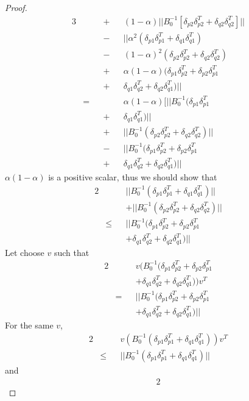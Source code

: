 \documentclass[11pt,twocolumn,varwidth=true,a4paper,fleqn]{article}
\begin{document}
\begin{proof}
\begin{alignat*}{3}
& && + && (1-\alpha)||B_0^{-1}[\delta_{p2}\delta_{p2}^T +
\delta_{q2}\delta_{q2}^T]|| \\
& && - && || \alpha^2(\delta_{p1}\delta_{p1}^T + \delta_{q1}\delta_{q1}^T) \\
& && - && (1-\alpha)^2(\delta_{p2}\delta_{p2}^T + \delta_{q2}\delta_{q2}^T) \\
& && + && \alpha(1-\alpha)(\delta_{p1}\delta_{p2}^T+\delta_{p2}\delta_{p1}^T \\
& && + && \delta_{q1}\delta_{q2}^T+\delta_{q2}\delta_{q1}^T) || \\
& = && && \alpha(1-\alpha)[||B_0^{-1}(\delta_{p1}\delta_{p1}^T \\
& && + && \delta_{q1}\delta_{q1}^T)||\\
& && + && ||B_0^{-1}(\delta_{p2}\delta_{p2}^T + \delta_{q2}\delta_{q2}^T)|| \\
& && - && ||B_0^{-1}(\delta_{p1}\delta_{p2}^T+\delta_{p2}\delta_{p1}^T \\
& && + && \delta_{q1}\delta_{q2}^T+\delta_{q2}\delta_{q1}^T)||
\end{alignat*}
$\alpha(1-\alpha)$ is a positive scalar, thus we should show that
\begin{alignat*}{2}
& && ||B_0^{-1}(\delta_{p1}\delta_{p1}^T + \delta_{q1}\delta_{q1}^T)|| \\
& && + ||B_0^{-1}(\delta_{p2}\delta_{p2}^T + \delta_{q2}\delta_{q2}^T)|| \\
& \leq &&  ||B_0^{-1}(\delta_{p1}\delta_{p2}^T+\delta_{p2}\delta_{p1}^T \\
& && +\delta_{q1}\delta_{q2}^T+\delta_{q2}\delta_{q1}^T)||
\end{alignat*}
Let choose $v$ such that
\begin{alignat*}{2}
& && v(B_0^{-1}(\delta_{p1}\delta_{p2}^T+\delta_{p2}\delta_{p1}^T\\
& &&+\delta_{q1}\delta_{q2}^T+\delta_{q2}\delta_{q1}^T))v^T \\
& = &&||B_0^{-1}(\delta_{p1}\delta_{p2}^T+\delta_{p2}\delta_{p1}^T\\
& && + \delta_{q1}\delta_{q2}^T+\delta_{q2}\delta_{q1}^T)||
\end{alignat*}
For the same $v$,
\begin{alignat*}{2}
 & && v(B_0^{-1}(\delta_{p1}\delta_{p1}^T + \delta_{q1}\delta_{q1}^T))v^T \\
& \leq && ||B_0^{-1}(\delta_{p1}\delta_{p1}^T + \delta_{q1}\delta_{q1}^T)||
\end{alignat*}
and
\begin{alignat*}{2}

\end{alignat*}
\end{proof}
\end{document}
